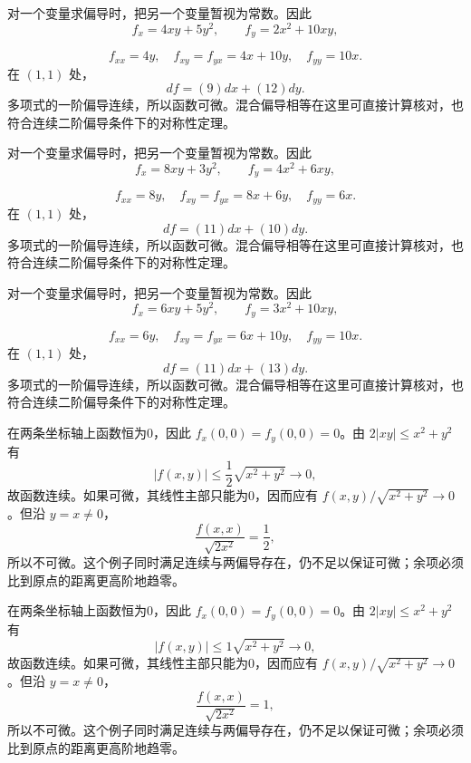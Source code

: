 \documentclass[UTF8,12pt,a4paper,fontset=fandol]{ctexart}
\begin{document}
\begin{solve}\label{ans:c32q17}
对一个变量求偏导时，把另一个变量暂视为常数。因此
\[
f_x=4xy+5y^2,\qquad f_y=2x^2+10xy,
\]

\[
f_{xx}=4y,\quad f_{xy}=f_{yx}=4x+10y,\quad f_{yy}=10x.
\]
在 $(1,1)$ 处，
\[
df=(9)dx+(12)dy.
\]
多项式的一阶偏导连续，所以函数可微。混合偏导相等在这里可直接计算核对，也符合连续二阶偏导条件下的对称性定理。
\end{solve}

\begin{solve}\label{ans:c32q18}
对一个变量求偏导时，把另一个变量暂视为常数。因此
\[
f_x=8xy+3y^2,\qquad f_y=4x^2+6xy,
\]

\[
f_{xx}=8y,\quad f_{xy}=f_{yx}=8x+6y,\quad f_{yy}=6x.
\]
在 $(1,1)$ 处，
\[
df=(11)dx+(10)dy.
\]
多项式的一阶偏导连续，所以函数可微。混合偏导相等在这里可直接计算核对，也符合连续二阶偏导条件下的对称性定理。
\end{solve}

\begin{solve}\label{ans:c32q19}
对一个变量求偏导时，把另一个变量暂视为常数。因此
\[
f_x=6xy+5y^2,\qquad f_y=3x^2+10xy,
\]

\[
f_{xx}=6y,\quad f_{xy}=f_{yx}=6x+10y,\quad f_{yy}=10x.
\]
在 $(1,1)$ 处，
\[
df=(11)dx+(13)dy.
\]
多项式的一阶偏导连续，所以函数可微。混合偏导相等在这里可直接计算核对，也符合连续二阶偏导条件下的对称性定理。
\end{solve}

\begin{solve}\label{ans:c32q20}
在两条坐标轴上函数恒为0，因此 $f_x(0,0)=f_y(0,0)=0$。由 $2|xy|\le x^2+y^2$ 有
\[
|f(x,y)|\le \frac{1}{2}\sqrt{x^2+y^2}\to0,
\]
故函数连续。如果可微，其线性主部只能为0，因而应有 $f(x,y)/\sqrt{x^2+y^2}\to0$。但沿 $y=x\ne0$，
\[
\frac{f(x,x)}{\sqrt{2x^2}}=\frac{1}{2},
\]
所以不可微。这个例子同时满足连续与两偏导存在，仍不足以保证可微；余项必须比到原点的距离更高阶地趋零。
\end{solve}

\begin{solve}\label{ans:c32q21}
在两条坐标轴上函数恒为0，因此 $f_x(0,0)=f_y(0,0)=0$。由 $2|xy|\le x^2+y^2$ 有
\[
|f(x,y)|\le 1\sqrt{x^2+y^2}\to0,
\]
故函数连续。如果可微，其线性主部只能为0，因而应有 $f(x,y)/\sqrt{x^2+y^2}\to0$。但沿 $y=x\ne0$，
\[
\frac{f(x,x)}{\sqrt{2x^2}}=1,
\]
所以不可微。这个例子同时满足连续与两偏导存在，仍不足以保证可微；余项必须比到原点的距离更高阶地趋零。
\end{solve}
\end{document}
